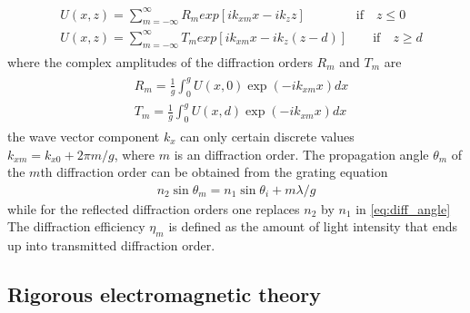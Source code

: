\begin{align}\label{eq:rayleigh}
\begin{split}
&U(x,z)= \sum_{m=-\infty}^{\infty}R_{m} exp\left[ ik_{xm}x-ik_{z}z \right] \qquad\qquad \text{if} \quad z\leq 0\\
&U(x,z)= \sum_{m=-\infty}^{\infty}T_{m} exp\left[ ik_{xm}x-ik_{z}(z-d)\right] \qquad \text{if} \quad z \geq d
\end{split}
\end{align}
where the complex amplitudes of the diffraction orders $R_m$ and $T_m$ are
\begin{align}\label{eq:Rm_Tm}
\begin{split}
&R_{m}= \frac{1}{g}\int_0^g U(x,0)\exp(-ik_{xm}x)dx\\
&T_{m}= \frac{1}{g}\int_0^g U(x,d)\exp(-ik_{xm}x)dx
\end{split}
\end{align}
the wave vector component $k_x$ can only certain discrete values $k_{xm} = k_{x0} + 2 \pi m / g$, where $m$ is an diffraction order. The propagation angle $\theta_m$ of the $m$th diffraction order can be obtained from the grating equation
\begin{align}\label{eq:diff_angle}
n_2 \sin \theta_m = n_1 \sin \theta_i + m \lambda /g
\end{align}
while for the reflected diffraction orders one replaces $n_2$ by $n_1$ in \cref{eq:diff_angle}
The diffraction efficiency $\eta_m$ is defined as the amount of light intensity that ends up into transmitted diffraction order.

\subsection{Rigorous electromagnetic theory}

